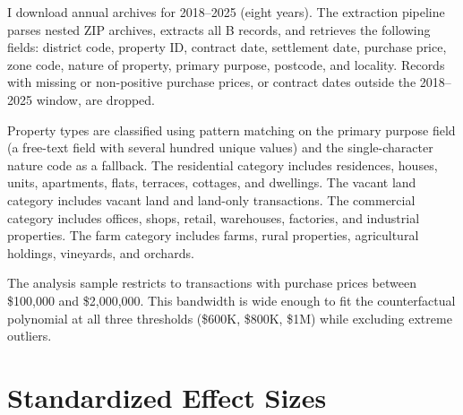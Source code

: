 \documentclass[12pt]{article}
\begin{document}
I download annual archives for 2018--2025 (eight years). The extraction pipeline parses nested ZIP archives, extracts all B records, and retrieves the following fields: district code, property ID, contract date, settlement date, purchase price, zone code, nature of property, primary purpose, postcode, and locality. Records with missing or non-positive purchase prices, or contract dates outside the 2018--2025 window, are dropped.

Property types are classified using pattern matching on the primary purpose field (a free-text field with several hundred unique values) and the single-character nature code as a fallback. The residential category includes residences, houses, units, apartments, flats, terraces, cottages, and dwellings. The vacant land category includes vacant land and land-only transactions. The commercial category includes offices, shops, retail, warehouses, factories, and industrial properties. The farm category includes farms, rural properties, agricultural holdings, vineyards, and orchards.

The analysis sample restricts to transactions with purchase prices between \$100,000 and \$2,000,000. This bandwidth is wide enough to fit the counterfactual polynomial at all three thresholds (\$600K, \$800K, \$1M) while excluding extreme outliers.


\section{Standardized Effect Sizes}
\label{sec:sde}


\end{document}

